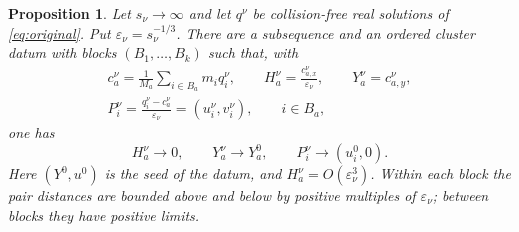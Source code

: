 \documentclass[11pt,a4paper]{amsart}
\newtheorem{proposition}[theorem]{Proposition}
\numberwithin{equation}{section}
\newcommand{\eps}{\varepsilon}
\begin{document}
\begin{proposition}\label{prop:seed-limits}
Let $s_\nu\to\infty$ and let $q^\nu$ be collision-free real solutions
of \eqref{eq:original}. Put $\eps_\nu=s_\nu^{-1/3}$. There are a
subsequence and an ordered cluster datum with blocks $(B_1,\ldots,B_k)$
such that,
with
\begin{equation}\label{eq:sequence-coordinates}
 \begin{gathered}
 c_a^\nu=\frac1{M_a}\sum_{i\in B_a}m_iq_i^\nu,\qquad
 H_a^\nu=\frac{c_{a,x}^\nu}{\eps_\nu},\qquad
 Y_a^\nu=c_{a,y}^\nu,\\
 P_i^\nu=\frac{q_i^\nu-c_a^\nu}{\eps_\nu}
          =(u_i^\nu,v_i^\nu),\qquad i\in B_a,
 \end{gathered}
\end{equation}
one has
\begin{equation}\label{eq:seed-limits}
 H_a^\nu\longrightarrow0,\qquad
 Y_a^\nu\longrightarrow Y_a^0,\qquad
 P_i^\nu\longrightarrow(u_i^0,0).
\end{equation}
Here $(Y^0,u^0)$ is the seed of the datum, and
$H_a^\nu=O(\eps_\nu^3)$. Within each block the pair distances are
bounded above and below by positive multiples of $\eps_\nu$;
between blocks they have positive limits.
\end{proposition}
\end{document}
